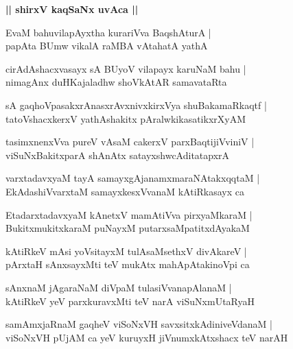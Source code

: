 \documentclass[twoside,12pt,openright]{book}
\newcounter{shloka}[chapter]
\def\uvaca#1{\centerline{{\large\textbf{#1}}}}
\begin{document}
\uvaca{|| shirxV kaqSaNx uvAca ||}

\begin{shloka}%
EvaM bahuvilapAyxtha kurariVva BaqshAturA |\\
papAta BUmw vikalA raMBA vAtahatA yathA
\end{shloka}

\begin{shloka}%
cirAdAshacxvasayx sA BUyoV vilapayx karuNaM bahu |\\
nimagAnx duHKajaladhw shoVkAtAR samavataRta
\end{shloka}

\begin{shloka}%
sA gaqhoVpasakxrAnasxrAvxnivxkirxVya shuBakamaRkaqtf |\\
tatoVshacxkerxV yathAshakitx pAralwkikasatikxrXyAM 
\end{shloka}

\begin{shloka}%
tasimxnenxVva pureV vAsaM cakerxV parxBaqtijiVviniV |\\
viSuNxBakitxparA shAnAtx satayxshwcAditatapxrA 
\end{shloka}

\begin{shloka}%
varxtadavxyaM tayA samayxgAjanamxmaraNAtakxqqtaM |\\
EkAdashiVvarxtaM samayxkesxVvanaM kAtiRkasayx ca
\end{shloka}

\begin{shloka}%
EtadarxtadavxyaM kAnetxV mamAtiVva pirxyaMkaraM |\\
BukitxmukitxkaraM puNayxM putarxsaMpatitxdAyakaM 
\end{shloka}

\begin{shloka}%
kAtiRkeV mAsi yoVsitayxM tulAsaMsethxV divAkareV |\\
pArxtaH sAnxsayxMti teV mukAtx mahApAtakinoVpi ca 
\end{shloka}

\begin{shloka}%
sAnxnaM jAgaraNaM diVpaM tulasiVvanapAlanaM |\\
kAtiRkeV yeV parxkuravxMti teV narA viSuNxmUtaRyaH 
\end{shloka}

\begin{shloka}%
samAmxjaRnaM gaqheV viSoNxVH savxsitxkAdiniveVdanaM |\\
viSoNxVH pUjAM ca yeV kuruyxH jiVnumxkAtxshacx teV narAH 
\end{shloka}
\end{document}
